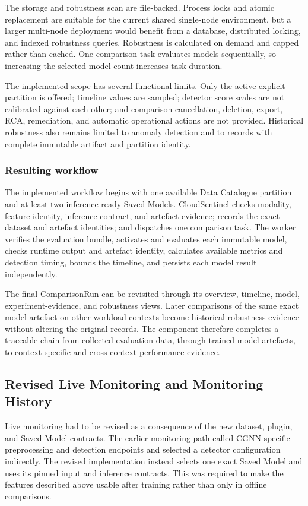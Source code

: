 The storage and robustness scan are file-backed. Process locks and atomic replacement are suitable for the current shared single-node environment, but a larger multi-node deployment would benefit from a database, distributed locking, and indexed robustness queries. Robustness is calculated on demand and capped rather than cached. One comparison task evaluates models sequentially, so increasing the selected model count increases task duration.

The implemented scope has several functional limits. Only the active explicit partition is offered; timeline values are sampled; detector score scales are not calibrated against each other; and comparison cancellation, deletion, export, RCA, remediation, and automatic operational actions are not provided. Historical robustness also remains limited to anomaly detection and to records with complete immutable artifact and partition identity.

\subsubsection{Resulting workflow}

The implemented workflow begins with one available Data Catalogue partition and at least two inference-ready Saved Models. CloudSentinel checks modality, feature identity, inference contract, and artefact evidence; records the exact dataset and artefact identities; and dispatches one comparison task. The worker verifies the evaluation bundle, activates and evaluates each immutable model, checks runtime output and artefact identity, calculates available metrics and detection timing, bounds the timeline, and persists each model result independently.

The final ComparisonRun can be revisited through its overview, timeline, model, experiment-evidence, and robustness views. Later comparisons of the same exact model artefact on other workload contexts become historical robustness evidence without altering the original records. The component therefore completes a traceable chain from collected evaluation data, through trained model artefacts, to context-specific and cross-context performance evidence.

\subsection{Revised Live Monitoring and Monitoring History}

Live monitoring had to be revised as a consequence of the new dataset, plugin, and Saved Model contracts. The earlier monitoring path called CGNN-specific preprocessing and detection endpoints and selected a detector configuration indirectly. The revised implementation instead selects one exact Saved Model and uses its pinned input and inference contracts. This was required to make the features described above usable after training rather than only in offline comparisons.

